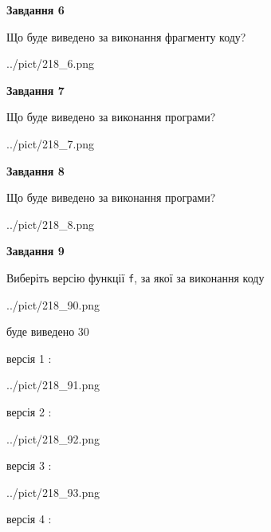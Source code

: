 \documentclass[12pt, ukrainian]{article}
\def\code#1{\Verb!#1!}
\begin{document}
{\begin {large}
{\begin {center}\textbf{Завдання 6}\end {center}}

Що буде виведено за виконання фрагменту коду?\par
\begin{center}
	{../pict/218_6.png}
\end{center}
\newpage

{\begin {center}\textbf{Завдання 7}\end {center}}

Що буде виведено за виконання програми?\par
\begin{center}
	{../pict/218_7.png}
\end{center}
\newpage

{\begin {center}\textbf{Завдання 8}\end {center}}

Що буде виведено за виконання програми?\par
\begin{center}
	{../pict/218_8.png}
\end{center}
\newpage

{\begin {center}\textbf{Завдання 9}\end {center}}

Виберіть версію функції \code{f}, за якої за виконання коду
\begin{center}
	{../pict/218_90.png}
\end{center}
буде виведено 30

\vspace{5mm}
версія 1 :

\begin{center}
	{../pict/218_91.png}
\end{center}
версія 2 :

\begin{center}
	{../pict/218_92.png}
\end{center}
версія 3 :

\begin{center}
	{../pict/218_93.png}
\end{center}
версія 4 :


\end{large}}
\end{document}

